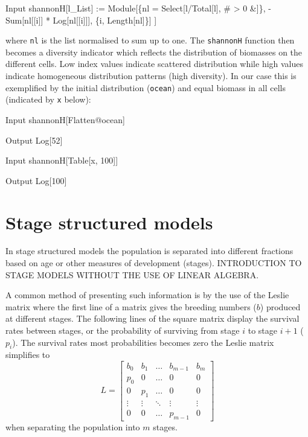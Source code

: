\documentclass[11pt,fleqn]{book} %
\begin{document}
\begin{theorem}
\begin{mmaCell}{Input}
  shannonH[l_List] := 
    Module[\{nl = Select[l/Total[l], # > 0 &]\},
      - Sum[nl[[i]] * Log[nl[[i]]], \{i, Length[nl]\}]
    ]
\end{mmaCell}
where \texttt{nl} is the list normalised to sum up to one. The \texttt{shannonH} function then becomes a diversity indicator which reflects the distribution of biomasses on the different cells. Low index values indicate scattered distribution while high values indicate homogeneous distribution patterns (high diversity). In our case this is exemplified by the initial distribution (\texttt{ocean}) and equal biomass in all cells (indicated by \texttt{x} below):
\begin{mmaCell}{Input}
  shannonH[Flatten@ocean]
\end{mmaCell}
\begin{mmaCell}{Output}
  Log[52]
\end{mmaCell}
\begin{mmaCell}{Input}
  shannonH[Table[x, {100}]]
\end{mmaCell}
\begin{mmaCell}{Output}
  Log[100]
\end{mmaCell}
\label{code:2D CA}
\end{theorem}

\section{Stage structured models}

In stage structured models the population is separated into different fractions based on age or other measures of development (stages). INTRODUCTION TO STAGE MODELS WITHOUT THE USE OF LINEAR ALGEBRA.

A common method of presenting such information is by the use of the Leslie matrix\cite{Leslie1945} where the first line of a matrix gives the breeding numbers ($b$) produced at different stages. The following lines of the square matrix display the survival rates between stages, or the probability of surviving from stage $i$ to stage $i+1$ ($p_{i}$). The survival rates most probabilities becomes zero the Leslie matrix simplifies to
\begin{equation}
\label{eq:lesliem}
L = 
\begin{bmatrix}
    b_{0} & b_{1} & \dots  & b_{m-1}  & b_{m} \\
    p_{0}  & 0 & \dots  & 0 & 0 \\
    0  &  p_{1} & \dots  & 0 & 0 \\
    \vdots  & \vdots & \ddots & \vdots & \vdots \\
    0  & 0 & \dots  & p_{m-1} & 0
\end{bmatrix}
\end{equation}
when separating the population into $m$ stages.
\end{document}
